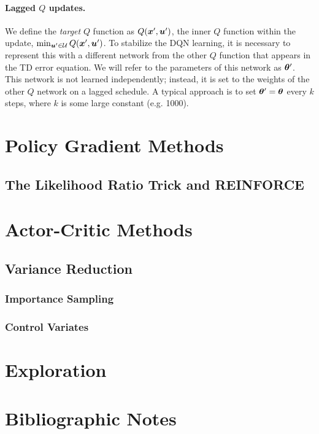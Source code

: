 \paragraph{Lagged $Q$ updates.} We define the \textit{target} $Q$ function as $Q(\bm{x}',\bm{u}')$, the inner $Q$ function within the update, $\min_{\bm{u}' \in \mathcal{U}} Q(\bm{x}',\bm{u}')$. To stabilize the DQN learning, it is necessary to represent this with a different network from the other $Q$ function that appears in the TD error equation. We will refer to the parameters of this network  as $\bm{\theta}'$. This network is not learned independently; instead, it is set to the weights of the other $Q$ network on a lagged schedule. A typical approach is to set $\bm{\theta}' = \bm{\theta}$ every $k$ steps, where $k$ is some large constant (e.g. 1000). 



\section{Policy Gradient Methods}

\subsection{The Likelihood Ratio Trick and REINFORCE}





\section{Actor-Critic Methods}


\subsection{Variance Reduction}

\subsubsection{Importance Sampling}

\subsubsection{Control Variates}

\section{Exploration}

\section{Bibliographic Notes}